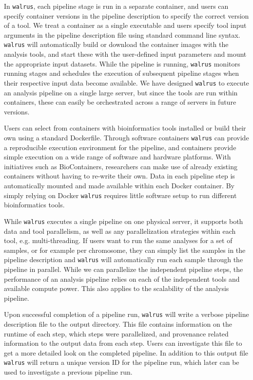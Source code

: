 In \texttt{walrus}, each pipeline stage is run in a separate container, and
users can specify container versions in the pipeline description to specify the
correct version of a tool. We treat a container as a single executable and users
specify tool input arguments in the pipeline description file using standard
command line syntax. \texttt{walrus} will automatically build or download the
container images with the analysis tools, and start these with the user-defined
input parameters and mount the appropriate input datasets. While the pipeline is
running, \texttt{walrus} monitors running stages and schedules the execution of
subsequent pipeline stages when their respective input data become available. We
have designed \texttt{walrus} to execute an analysis pipeline on a single large
server, but since the tools are run within containers, these can easily be
orchestrated across a range of servers in future versions. 

Users can select from containers with bioinformatics tools installed or build
their own using a standard Dockerfile. Through software containers
\texttt{walrus} can provide a reproducible execution environment for the
pipeline, and containers provide simple execution on a wide range of software
and hardware platforms.  With initiatives such as
BioContainers,\cite{biocontainers} researchers can make use of already existing
containers without having to re-write their own. Data in each pipeline step is
automatically mounted and made available within each Docker container. By simply
relying on Docker \texttt{walrus} requires little software setup to run
different bioinformatics tools. 

While \texttt{walrus} executes a single pipeline on one physical server, it
supports both data and tool parallelism, as well as any parallelization
strategies within each tool, e.g. multi-threading. If users want to run the same
analyses for a set of samples, or for example per chromosome, they can simply
list the samples in the pipeline description and \texttt{walrus} will
automatically run each sample through the pipeline in parallel. While we can
parallelize the independent pipeline steps, the performance of an analysis
pipeline relies on each of the independent tools and available compute power.
This also applies to the scalability of the analysis pipeline. 

Upon successful completion of a pipeline run, \texttt{walrus} will write a
verbose pipeline description file to the output directory. This file contains
information on the runtime of each step, which steps were parallelized, and
provenance related information to the output data from each step. Users can
investigate this file to get a more detailed look on the completed pipeline. In
addition to this output file \texttt{walrus} will return a unique version ID for
the pipeline run, which later can be used to investigate a previous pipeline
run. 

